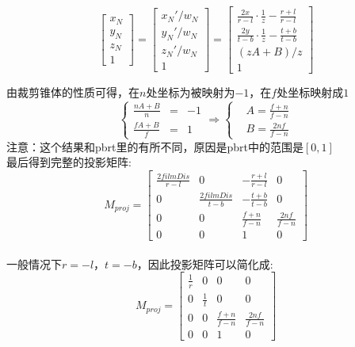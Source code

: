 \begin{displaymath}
\begin{bmatrix}
x_N\\
y_N\\
z_N\\
1
\end{bmatrix} = 
\begin{bmatrix}
x_N'/w_N\\
y_N'/w_N\\
z_N'/w_N\\
1
\end{bmatrix} = 
\begin{bmatrix}
\frac{2x}{r - l}\cdot\frac{1}{z} - \frac{r + l}{r - l}\\
\frac{2y}{t - b}\cdot\frac{1}{z} - \frac{t + b}{t - b}\\
(zA + B) / z \\
1
\end{bmatrix}
\end{displaymath}

由裁剪锥体的性质可得，在$n$处坐标为被映射为$-1$，在$f$处坐标映射成$1$
\begin{displaymath}
\left\{
\begin{aligned}{}
\frac{nA + B}{n} & = & -1\\
\frac{fA + B}{f} & = & 1
\end{aligned}
\right.
\Rightarrow
\left\{
\begin{aligned}
&A = \frac{f + n}{f - n}\\
&B = \frac{2nf}{f - n}
\end{aligned}
\right.
\end{displaymath}
注意：这个结果和pbrt里的有所不同，原因是pbrt中的范围是$[0,1]$
\\

最后得到完整的投影矩阵:
\begin{displaymath}
M_{proj} = 
\begin{bmatrix}
\frac{2filmDis}{r - l} & 0 & -\frac{r + l}{r - l} & 0\\
0 & \frac{2filmDis}{t - b} & -\frac{t + b}{t - b} & 0\\
0 & 0 & \frac{f + n}{f - n} & \frac{2nf}{f - n}\\
0 & 0 & 1 & 0
\end{bmatrix}
\end{displaymath}
\\

一般情况下$r = -l$，$t = -b$，因此投影矩阵可以简化成:
\begin{displaymath}
M_{proj} = 
\begin{bmatrix}
\frac{1}{r} & 0 & 0 & 0\\
0 & \frac{1}{t} & 0 & 0\\
0 & 0 & \frac{f + n}{f - n} & \frac{2nf}{f - n}\\
0 & 0 & 1 & 0
\end{bmatrix}
\end{displaymath}
